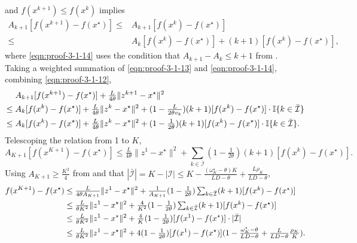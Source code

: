 and  $f (x^{k + 1}) \leq f (x^k)$ implies
\begin{align}
  A_{k + 1} [f (x^{k + 1}) - f (x^{\star})] \leq{} & A_{k + 1} [f (x^k) - f
  (x^{\star})] \nonumber\\
  \leq{} & A_k [f (x^k) - f (x^{\star})] + (k + 1) [f (x^k) - f (x^{\star})] \label{eqn:proof-3-1-14},
\end{align}
where \eqref{eqn:proof-3-1-14} uses the condition that $A_{k + 1} - A_k \leq k + 1$ from .\\

Taking a weighted summation of \eqref{eqn:proof-3-1-13} and \eqref{eqn:proof-3-1-14}, combining \eqref{eqn:proof-3-1-12},
\begin{align}
  & A_{k + 1} [f (x^{k + 1}) - f (x^{\star})] + \tfrac{L}{4 \theta} \| z^{k +
  1} - x^{\star} \|^2 \nonumber\\
  \leq{} & A_k [f (x^k) - f (x^{\star})] + \tfrac{L}{4 \theta} \| z^k -
  x^{\star} \|^2 + ( 1 - \tfrac{L}{2 \theta v_k} ) (k + 1) [f (x^k) - f
  (x^{\star})] \cdot \mathbb{I} \{ k \in \bar{\mathcal{I}} \} \nonumber\\
  \leq {} & A_k [f (x^k) - f (x^{\star})] + \tfrac{L}{4 \theta} \| z^k -
  x^{\star} \|^2 + ( 1 - \tfrac{1}{2 \theta} ) (k + 1) [f (x^k) - f
  (x^{\star})] \cdot \mathbb{I} \{ k \in \bar{\mathcal{I}} \} . \nonumber
\end{align}
Telescoping the relation from 1 to $K$,
\[ \textstyle A_{K + 1} [f (x^{K + 1}) - f (x^{\star})] \leq \tfrac{L}{4 \theta} \| z^1
   - x^{\star} \|^2 + \sum_{k \in \bar{\mathcal{I}}} ( 1 - \tfrac{1}{2
   \theta} ) (k + 1) [f (x^k) - f (x^{\star})] . \]
Using $A_{K + 1} \geq \tfrac{K^2}{4}$ from  and that $| \bar{\mathcal{I}} | = K - |
\mathcal{I} | \leq K - \tfrac{(\omega^\star_K - \theta) K}{L D - \theta} + \tfrac{L
\rho_K}{L D - \theta}$,
\begin{align}
  f (x^{K + 1}) - f (x^{\star}) \leq{} & \tfrac{L}{4 \theta A_{K + 1}} \| z^1 -
  x^{\star} \|^2 + \tfrac{1}{A_{K + 1}} ( 1 - \tfrac{1}{2 \theta} )
  \textstyle\sum_{k \in \bar{\mathcal{I}}} (k + 1) [f (x^k) - f (x^{\star})] \nonumber\\
  \leq{} & \tfrac{L}{\theta K^2} \| z^1 - x^{\star} \|^2 + \tfrac{4}{K^2}
  ( 1 - \tfrac{1}{2 \theta} ) \textstyle\sum_{k \in \bar{\mathcal{I}}} (k + 1) [f
  (x^k) - f (x^{\star})] \nonumber\\
  \leq{} & \tfrac{L}{\theta K^2} \| z^1 - x^{\star} \|^2 + \tfrac{4}{K} (
  1 - \tfrac{1}{2 \theta} ) [f (x^1) - f (x^{\star})] \cdot |
  \bar{\mathcal{I}} | \nonumber\\
  \leq{} & \tfrac{L}{\theta K^2} \| z^1 - x^{\star} \|^2 + 4 ( 1 -
  \tfrac{1}{2 \theta} ) [f (x^1) - f (x^{\star})] ( 1 -
  \tfrac{\omega^\star_K - \theta}{L D - \theta} + \tfrac{L}{L D - \theta}
  \tfrac{\rho_K}{K} ) . \nonumber
\end{align}

